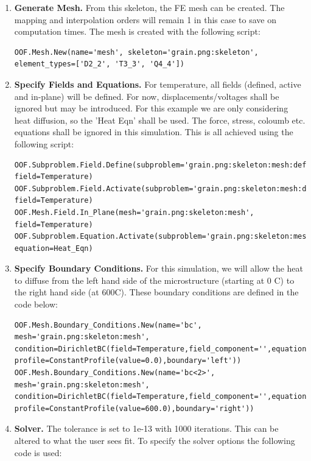 \documentclass{article}
\begin{document}
\begin{enumerate}
\item \textbf{Generate Mesh.} From this skeleton, the FE mesh can be created. The mapping and interpolation orders will remain 1 in this case to save on computation times. The mesh is created with the following script:

\lstset{language=Python}
\begin{lstlisting}
OOF.Mesh.New(name='mesh', skeleton='grain.png:skeleton', element_types=['D2_2', 'T3_3', 'Q4_4'])
\end{lstlisting}

\item \textbf{Specify Fields and Equations.} For temperature, all fields (defined, active and in-plane) will be defined. For now, displacements/voltages shall be ignored but may be introduced. For this example we are only considering heat diffusion, so the 'Heat Eqn' shall be used. The force, stress, coloumb etc. equations shall be ignored in this simulation. This is all achieved using the following script:

\lstset{language=Python}
\begin{lstlisting}
OOF.Subproblem.Field.Define(subproblem='grain.png:skeleton:mesh:default', field=Temperature)
OOF.Subproblem.Field.Activate(subproblem='grain.png:skeleton:mesh:default', field=Temperature)
OOF.Mesh.Field.In_Plane(mesh='grain.png:skeleton:mesh', field=Temperature)
OOF.Subproblem.Equation.Activate(subproblem='grain.png:skeleton:mesh:default', equation=Heat_Eqn)
\end{lstlisting}

\item \textbf{Specify Boundary Conditions.} For this simulation, we will allow the heat to diffuse from the left hand side of the microstructure (starting at 0 C) to the right hand side (at 600C). These boundary conditions are defined in the code below:

\lstset{language=Python}
\begin{lstlisting}
OOF.Mesh.Boundary_Conditions.New(name='bc', mesh='grain.png:skeleton:mesh', condition=DirichletBC(field=Temperature,field_component='',equation=Heat_Eqn,eqn_component='',
profile=ConstantProfile(value=0.0),boundary='left'))
OOF.Mesh.Boundary_Conditions.New(name='bc<2>', mesh='grain.png:skeleton:mesh', condition=DirichletBC(field=Temperature,field_component='',equation=Heat_Eqn,eqn_component='',
profile=ConstantProfile(value=600.0),boundary='right'))
\end{lstlisting}

\item \textbf{Solver.} The tolerance is set to 1e-13 with 1000 iterations. This can be altered to what the user sees fit. To specify the solver options the following code is used:


\end{enumerate}
\end{document}

